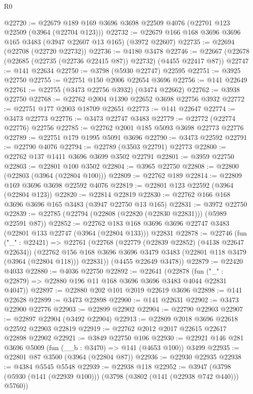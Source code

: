 \begin{lexlean}{R0}
\begin{coremodule}
@22720 := @22679 @189 @169 @3696 @3698 @22509 @4076 (@22701 @123 @22509 (@3964 (@22704 @123)))
@22732 := @22679 @166 @168 @3696 @3696 @165 @3483 (@3947 @22607 @13 @165) (@3972 @22607)
@22735 := @22694 (@22708 (@22720 @22732))
@22736 := @4180 @3478
@22746 := @22667 (@22678 (@22685 (@22735 (@22736 @22415 @87)) @22732) (@4455 @22417 @87))
@22747 := @141 @22634
@22750 := @3798 (@5930 @22747) @22595
@22751 := @3925 @22750
@22755 := @22751 @150 @2006 @22654 @3696
@22756 := @141 @22649
@22761 := @22755 (@3473 @22756 @3932) (@3474 @22662)
@22762 := @3938 @22750
@22768 := @22762 @2004 @1390 @22652 @3698 @22756 @3932
@22772 := @22751 @177 @2003 @18709 @22651
@22773 := @141 @22647
@22774 := @3473 @22773
@22776 := @3473 @22747 @3483
@22779 := @22772 (@22774 @22776) @22756
@22785 := @22762 @2001 @185 @5093 @3698 @22773 @22776
@22789 := @22751 @179 @1995 @5091 @3696
@22790 := @3473 @22592
@22791 := @22790 @4076
@22794 := @22789 (@3503 @22791) @22773
@22800 := @22762 @137 @1411 @3696 @3699 @3502 @22791
@22801 := @3959 @22750
@22803 := @22801 @100 @3502
@22804 := @3965 @22750
@22808 := @22800 (@22803 (@3964 (@22804 @100)))
@22809 := @22762 @189
@22814 := @22809 @169 @3696 @3698 @22592 @4076
@22819 := @22801 @123 @22592 (@3964 (@22804 @123))
@22820 := @22814 @22819
@22830 := @22762 @166 @168 @3696 @3696 @165 @3483 (@3947 @22750 @13 @165)
@22831 := @3972 @22750
@22839 := @22785 (@22794 (@22808 (@22820 (@22830 @22831))) (@5989 @22591 @87))
@22852 := @22762
    @183
    @168
    @3696
    @3696
    @22747
    @3483
    (@22801 @133 @22747 (@3964 (@22804 @133)))
    @22831
@22878 := @22746
    (fun ("_" : @22421) =>
    @22761
      (@22768
        (@22779 (@22839 @22852) (@4138 @22647 @22634))
        (@22762 @156 @168 @3696 @3696 @3479 @3483 (@22801 @118 @3479 (@3964 (@22804 @118))) @22831))
      (@4455 @22649 @3478))
@22879 := @22420 @4033
@22880 := @4036 @22750
@22892 := @22641
    (@22878 (fun ("_" : @22879) => @22880 @196 @11 @168 @3696 @3696 @3483 @4044 @22831 @4047))
@22897 := @22880 @202 @101 @2019 @22619 @3696
@22898 := @141 @22628
@22899 := @3473 @22898
@22900 := @141 @22631
@22902 := @3473 @22900 @22776
@22903 := @22899 @22902
@22904 := @22790 @22903
@22907 := @22897 @22904 (@3492 @22904)
@22913 := @22809 @2018 @3696 @22618 @22592 @22903 @22819
@22919 := @22762 @2012 @2017 @22615 @22617 @22898 @22902
@22921 := @3849 @22750 @106
@22930 := @22921 @146 @281 @3696 @5009 (fun (__b : @3470) => @141 (@4653 @100)) @3499
@22935 := @22801 @87 @3500 (@3964 (@22804 @87))
@22936 := @22930 @22935
@22938 := @4384 @5545 @5548
@22939 := @22938 @118
@22952 := @3947
    (@3798 (@5930 (@141 (@22939 @100))) (@3798 (@3802 (@141 (@22938 @742 @440))) @5760))

\end{coremodule}
\end{lexlean}
